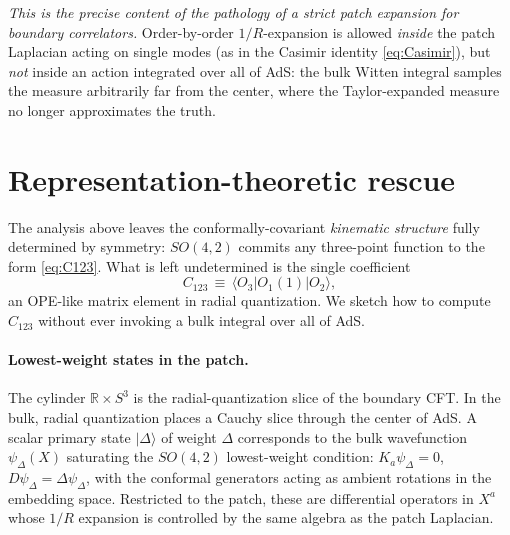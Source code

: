 \documentclass[11pt]{article}
\begin{document}
\emph{This is the precise content of the pathology of a strict patch expansion for boundary correlators.} Order-by-order $1/R$-expansion is allowed \emph{inside} the patch Laplacian acting on single modes (as in the Casimir identity \cref{eq:Casimir}), but \emph{not} inside an action integrated over all of AdS: the bulk Witten integral samples the measure arbitrarily far from the center, where the Taylor-expanded measure no longer approximates the truth.

\section{Representation-theoretic rescue}\label{sec:rescue}

The analysis above leaves the conformally-covariant \emph{kinematic structure} fully determined by symmetry: $SO(4,2)$ commits any three-point function to the form \cref{eq:C123}. What is left undetermined is the single coefficient
\begin{equation}
    C_{123}\,\equiv\,\langle O_3 | O_1(1) | O_2\rangle,
\end{equation}
an OPE-like matrix element in radial quantization. We sketch how to compute $C_{123}$ without ever invoking a bulk integral over all of AdS.

\paragraph{Lowest-weight states in the patch.} The cylinder $\mathbb{R}\times S^3$ is the radial-quantization slice of the boundary CFT. In the bulk, radial quantization places a Cauchy slice through the center of AdS. A scalar primary state $|\Delta\rangle$ of weight $\Delta$ corresponds to the bulk wavefunction $\psi_\Delta(X)$ saturating the $SO(4,2)$ lowest-weight condition: $K_a\psi_\Delta=0$, $D\psi_\Delta=\Delta\psi_\Delta$, with the conformal generators acting as ambient rotations in the embedding space. Restricted to the patch, these are differential operators in $X^a$ whose $1/R$ expansion is controlled by the same algebra as the patch Laplacian.
\end{document}
